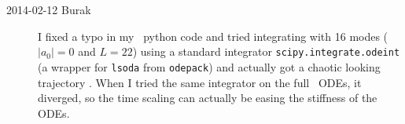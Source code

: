 \begin{description}
%
%


\item[2014-02-12 Burak] I fixed a typo in my \KS\ python code and tried
integrating  with 16 modes ($|a_0|=0$ and $L=22$)
using a standard integrator \texttt{scipy.integrate.odeint} (a wrapper
for \texttt{lsoda} from \texttt{odepack}) and actually got a chaotic looking
trajectory . When I tried the same integrator
on the full \statesp\ ODEs, it diverged, so the time scaling can actually
be easing the stiffness of the ODEs.


\end{description}
